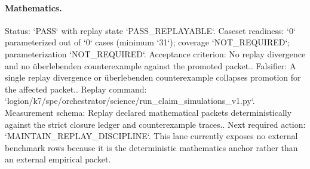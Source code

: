 \paragraph{Mathematics.}
Status: `PASS` with replay state `PASS\_REPLAYABLE`.
Caseset readiness: `0` parameterized out of `0` cases (minimum `31`); coverage `NOT\_REQUIRED`; parameterization `NOT\_REQUIRED`.
Acceptance criterion: No replay divergence and no überlebenden counterexample against the promoted packet..
Falsifier: A single replay divergence or überlebenden counterexample collapses promotion for the affected packet..
Replay command: `logion/k7/spe/orchestrator/science/run\_claim\_simulations\_v1.py`.
Measurement schema: Replay declared mathematical packets deterministically against the strict closure ledger and counterexample traces..
Next required action: `MAINTAIN\_REPLAY\_DISCIPLINE`.
This lane currently exposes no external benchmark rows because it is the deterministic mathematics anchor rather than an external empirical packet.

